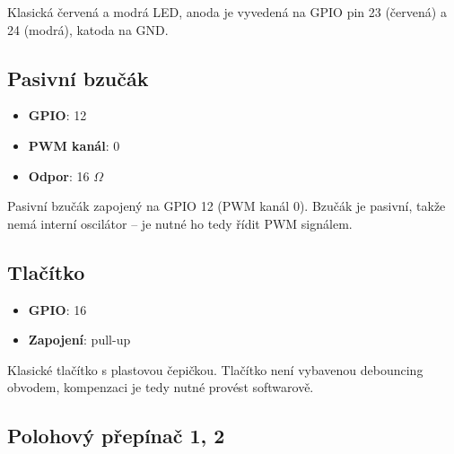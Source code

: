 \documentclass{article}
\newcommand\lang[2]{#1}
\begin{document}
\vspace{1em}

\noindent
\lang{Klasická červená a modrá LED, anoda je vyvedená na GPIO pin 23 (červená) a 24 (modrá), katoda na GND.}{Standard red and blue LED, anode is connected to GPIO pin 23 (red) and 24 (blue), cathode is connected to GND.}

\subsection{\lang{Pasivní bzučák}{Passive buzzer}}

\begin{itemize}[nosep]
	\item \textbf{GPIO}: 12
    \item \textbf{\lang{PWM kanál}{PWM channel}}: 0
	\item \textbf{\lang{Odpor}{Resistance}}: 16 $\Omega$
\end{itemize}

\vspace{1em}

\noindent
\lang{Pasivní bzučák zapojený na GPIO 12 (PWM kanál 0). Bzučák je pasivní, takže nemá interní oscilátor -- je nutné ho tedy řídit PWM signálem.}{Passive buzzer connected to GPIO 12 (PWM channel 0). The buzzer is passive, so it does not have the internal oscilator -- the pulse-width modulation (PWM) is needed to drive the buzzer.}

\subsection{\lang{Tlačítko}{Push button}}

\begin{itemize}[nosep]
	\item \textbf{GPIO}: 16
	\item \lang{\textbf{Zapojení}: pull-up}{\textbf{Wiring}: pull-up}
\end{itemize}

\vspace{1em}

\noindent
\lang{Klasické tlačítko s plastovou čepičkou. Tlačítko není vybavenou debouncing obvodem, kompenzaci je tedy nutné provést softwarově.}{Standard push button with plastic cap. The button does not have a debouncing electronics bundled in, so the compensation must be done in software.}

\subsection{\lang{Polohový přepínač 1, 2}{Switches 1, 2}}
\end{document}
